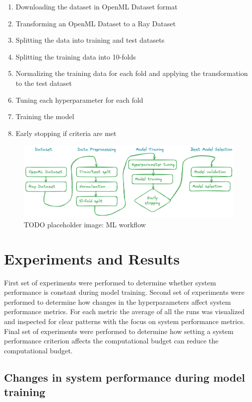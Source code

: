 \begin{enumerate}
    \item Downloading the dataset in OpenML Dataset format
    \item Transforming an OpenML Dataset to a Ray Dataset
    \item Splitting the data into training and test datasets
    \item Splitting the training data into 10-folds
    \item Normalizing the training data for each fold and applying the transformation to the test dataset
    \item Tuning each hyperparameter for each fold
    \item Training the model
    \item Early stopping if criteria are met
\end{enumerate}

\begin{figure}[h]
    \includegraphics[width=12cm]{assets/ml_workflow1.png}
    \caption{TODO placeholder image: ML workflow}
    \label{figure:mlworkflow}
\end{figure}

\section{Experiments and Results}

First set of experiments were performed to determine whether system performance is constant during model training. Second set of experiments were performed to determine how changes in the hyperparameters affect system performance metrics. For each metric the average of all the runs was visualized and inspected for clear patterns with the focus on system performance metrics. Final set of experiments were performed to determine how setting a system performance criterion affects the computational budget can reduce the computational budget.

\subsection{Changes in system performance during model training}

